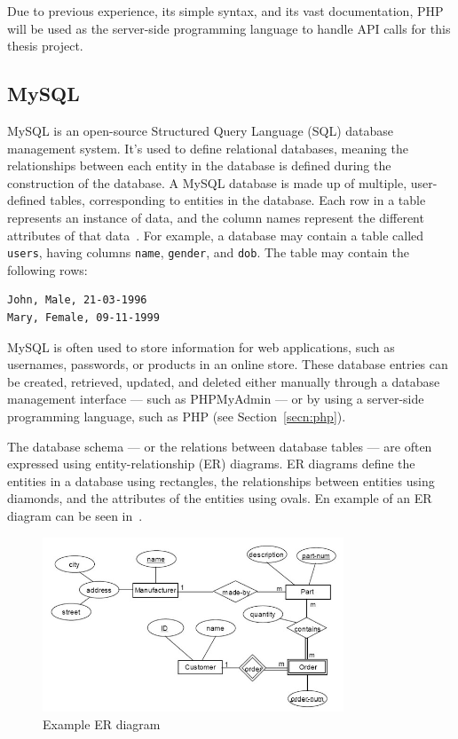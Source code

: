 \documentclass[12pt,openany,a4paper]{book}
\newcommand{\fig}[1]  {Fig.\,\ref{#1}}		%
\newcommand{\secn}[1] {Section~\ref{#1}}	%
\begin{document}
Due to previous experience, its simple syntax, and its vast documentation, PHP
will be used as the server-side programming language to handle API calls for
this thesis project.

\subsection{MySQL}

MySQL is an open-source Structured Query Language (SQL) database management
system. It's used to define relational databases, meaning the relationships between each
entity in the database is defined during the construction of the database. A MySQL
database is made up of multiple, user-defined tables, corresponding to entities
in the database. Each row in a table represents an instance of data, and the
column names represent the different attributes of that data~\cite{mysql_intro}.
For example, a database may contain a table called \verb|users|, having columns
\verb|name|, \verb|gender|, and \verb|dob|. The table may contain
the following rows:
\begin{verbatim}
John, Male, 21-03-1996
Mary, Female, 09-11-1999
\end{verbatim}

MySQL is often used to store information for web applications, such as usernames,
passwords, or products in an online store. These database entries can be created,
retrieved, updated, and deleted either manually through a database management interface
--- such as PHPMyAdmin --- or by using a server-side programming language, such as PHP
(see \secn{secn:php}).

The database schema --- or the relations between database tables --- are often expressed
using entity-relationship (ER) diagrams. ER diagrams define the entities in a database
using rectangles, the relationships between entities using diamonds, and the attributes
of the entities using ovals. En example of an ER diagram
can be seen in~\cite[\fig{fig:er_diagram_example}]{kandasamy_2016}.

\begin{figure}[h]
\centerline{\includegraphics[width=0.8\textwidth]{ERDiagramExample.jpg}}
\caption{Example ER diagram}
\label{fig:er_diagram_example}
\end{figure}
\end{document}
